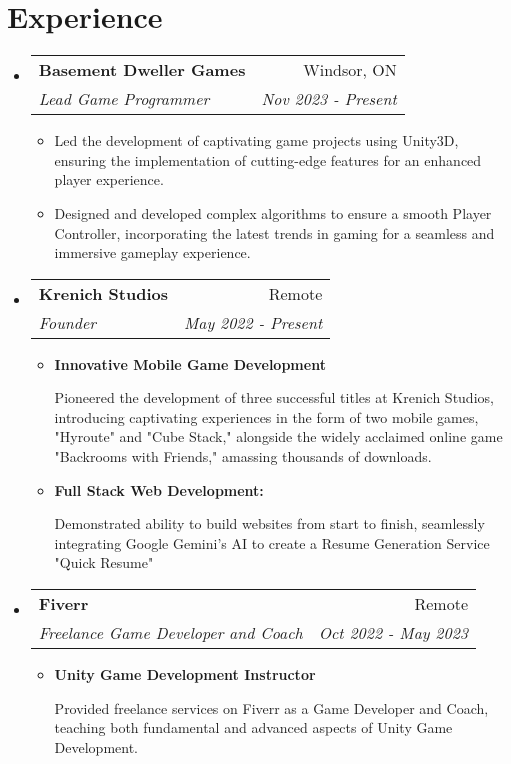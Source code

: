\documentclass[letterpaper,11pt]{article}
\makeatletter
\newcommand{\resumeItem}[1]{
  \item\small{
    {#1 \vspace{-2pt}}
  }
}
\newcommand{\resumeSubheading}[4]{
  \vspace{-2pt}\item
    \begin{tabular*}{0.97\textwidth}[t]{l@{\extracolsep{\fill}}r}
      \textbf{#1} & #2 \\
      \textit{\small#3} & \textit{\small #4} \\
    \end{tabular*}\vspace{-7pt}
}
\newcommand{\resumeSubHeadingListStart}{\begin{itemize}[leftmargin=0.15in, label={}]}
\newcommand{\resumeSubHeadingListEnd}{\end{itemize}}
\newcommand{\resumeItemListStart}{\begin{itemize}}
\newcommand{\resumeItemListEnd}{\end{itemize}\vspace{-5pt}}
\makeatother
\begin{document}
\section{Experience}
  \resumeSubHeadingListStart

    \resumeSubheading
      {Basement Dweller Games }{Windsor, ON}
      {Lead Game Programmer}{Nov 2023 - Present}
      \resumeItemListStart
        \resumeItem{Led the development of captivating game projects using Unity3D, ensuring the implementation of cutting-edge features for an enhanced player experience.}
        \resumeItem{Designed and developed complex algorithms to ensure a smooth Player Controller, incorporating the latest trends in gaming for a seamless and immersive gameplay experience.}
      \resumeItemListEnd
      \resumeSubheading
      {Krenich Studios }{Remote}
      {Founder}{May 2022 - Present}
      \resumeItemListStart
        \resumeItem{\textbf{Innovative Mobile Game Development}}
        {Pioneered the development of three successful titles at Krenich Studios, introducing captivating experiences in the form of two mobile games, "Hyroute" and "Cube Stack," alongside the widely acclaimed online game "Backrooms with Friends," amassing thousands of downloads.}
        \resumeItem{\textbf{Full Stack Web Development:}}
        {Demonstrated ability to build websites from start to finish, seamlessly integrating Google Gemini’s AI to create a Resume Generation Service "Quick Resume"}
      \resumeItemListEnd
      
        \resumeSubheading
      {Fiverr}{Remote}
      {Freelance Game Developer and Coach}{Oct 2022 - May 2023}
      \resumeItemListStart
        \resumeItem{\textbf{Unity Game Development Instructor}}
        {Provided freelance services on Fiverr as a Game Developer and Coach, teaching both fundamental and advanced aspects of Unity Game Development.}
      \resumeItemListEnd

  \resumeSubHeadingListEnd

  


\end{document}
